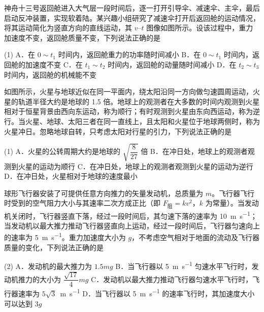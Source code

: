 \begin{question}
神舟十三号返回舱进入大气层一段时间后，逐一打开引导伞、减速伞、主伞，最后启动反冲装置，实现软着陆。某兴趣小组研究了减速伞打开后返回舱的运动情况，将其运动简化为竖直方向的直线运动，其 $v$--$t$ 图像如图所示。设该过程中，重力加速度不变，返回舱质量不变，下列说法正确的是\gkblank


\begin{gkopts}(1)
  \task A．在 $0\sim t_{1}$ 时间内，返回舱重力的功率随时间减小
  \task B．在 $0\sim t_{1}$ 时间内，返回舱的加速度不变
  \task C．在 $t_{1}\sim t_{2}$ 时间内，返回舱的动量随时间减小
  \task D．在 $t_{2}\sim t_{3}$ 时间内，返回舱的机械能不变
\end{gkopts}
\end{question}

\begin{question}
如图所示，火星与地球近似在同一平面内，绕太阳沿同一方向做匀速圆周运动，火星的轨道半径大约是地球的 1.5 倍。地球上的观测者在大多数的时间内观测到火星相对于恒星背景由西向东运动，称为顺行；有时观测到火星由东向西运动，称为逆行。当火星、地球、太阳三者在同一直线上，且太阳和火星位于地球两侧时，称为火星冲日。忽略地球自转，只考虑太阳对行星的引力，下列说法正确的是\gkblank


\begin{gkopts}(1)
  \task A．火星的公转周期大约是地球的 $\sqrt{\dfrac{8}{27}}$ 倍
  \task B．在冲日处，地球上的观测者观测到火星的运动为顺行
  \task C．在冲日处，地球上的观测者观测到火星的运动为逆行
  \task D．在冲日处，火星相对于地球的速度最小
\end{gkopts}
\end{question}

\begin{question}
球形飞行器安装了可提供任意方向推力的矢量发动机，总质量为 $m$。飞行器飞行时受到的空气阻力大小与其速率二次方成正比（即 $F_{\text{阻}}=kv^{2}$，$k$ 为常量）。当发动机关闭时，飞行器竖直下落，经过一段时间后，其匀速下落的速率为 \SI{10}{\metre\per\second}；当发动机以最大推力推动飞行器竖直向上运动，经过一段时间后，飞行器匀速向上的速率为 \SI{5}{\metre\per\second}。重力加速度大小为 $g$，不考虑空气相对于地面的流动及飞行器质量的变化，下列说法正确的是\gkblank

\begin{gkopts}(2)
  \task A．发动机的最大推力为 $1.5mg$
  \task B．当飞行器以 \SI{5}{\metre\per\second} 匀速水平飞行时，发动机推力的大小为 $\dfrac{\sqrt{17}}{4}mg$
  \task C．发动机以最大推力推动飞行器匀速水平飞行时，飞行器速率为 $5\sqrt{3}$~\si{\metre\per\second}
  \task D．当飞行器以 \SI{5}{\metre\per\second} 的速率飞行时，其加速度大小可以达到 $3g$
\end{gkopts}
\end{question}


